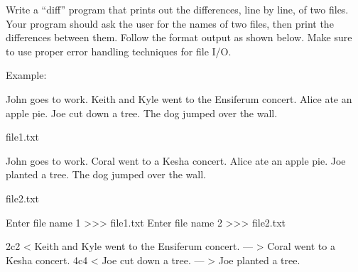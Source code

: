 \documentclass[11pt]{cselabheader}
\begin{document}
  \begin{ex}[diff.py]
    Write a ``diff'' program that prints out the differences, line by line, of
    two files.  Your program should ask the user for the names of two files,
    then print the differences between them.  Follow the format output as shown
    below. Make sure to use proper error handling techniques for file I/O.

    Example:

\begin{listing}[H]
  \vspace{-0.5em}
    \begin{verbatimcode}
John goes to work.
Keith and Kyle went to the Ensiferum concert.
Alice ate an apple pie.
Joe cut down a tree.
The dog jumped over the wall.
    \end{verbatimcode}
  \vspace{-0.5em}
  \caption{file1.txt}
  \vspace{-0.5em}
\end{listing}

\begin{listing}[H]
  \vspace{-0.5em}
    \begin{verbatimcode}
John goes to work.
Coral went to a Kesha concert.
Alice ate an apple pie.
Joe planted a tree.
The dog jumped over the wall.
    \end{verbatimcode}
  \vspace{-0.5em}
  \caption{file2.txt}
  \vspace{-0.5em}
\end{listing}

    \begin{verbatimcode}
Enter file name 1 >>> file1.txt
Enter file name 2 >>> file2.txt

2c2
< Keith and Kyle went to the Ensiferum concert.
---
> Coral went to a Kesha concert.
4c4
< Joe cut down a tree.
---
> Joe planted a tree.
    \end{verbatimcode}
  \end{ex}
\end{document}
